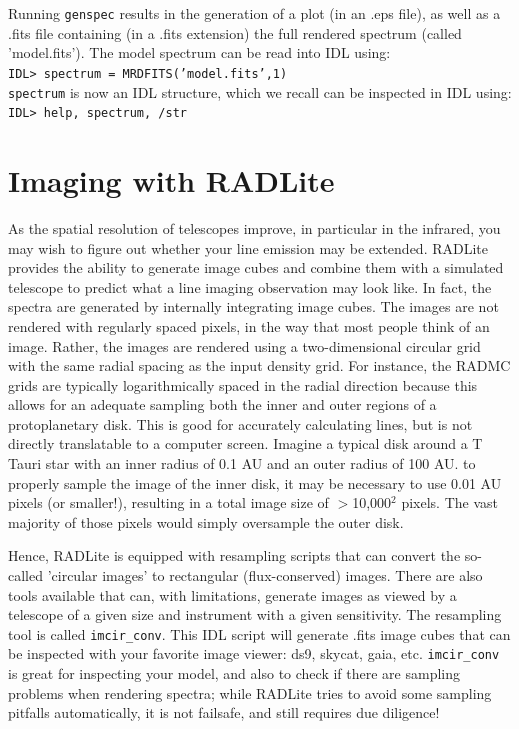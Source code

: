 \documentclass[11pt]{article}
\begin{document}
Running {\tt genspec} results in the generation of a plot (in an .eps file), as well as a .fits file containing (in a .fits extension) the full rendered spectrum (called 'model.fits'). 
The model spectrum can be read into IDL using:\\
{\tt IDL> spectrum = MRDFITS('model.fits',1)} \\
{\tt spectrum} is now an IDL structure, which we recall can be inspected in IDL using:\\
{\tt IDL> help, spectrum, /str}

\section{Imaging with RADLite}

As the spatial resolution of telescopes improve, in particular in the infrared, you may wish to figure out whether your line emission
may be extended. RADLite provides the ability to generate image cubes and combine them with a simulated telescope to predict what a 
line imaging observation may look like. In fact, the spectra are generated by internally integrating image cubes. The images are
not rendered with regularly spaced pixels, in the way that most people think of an image. Rather, the images are rendered using a 
two-dimensional circular grid with the same radial spacing as the input density grid. For instance, the RADMC grids are typically
logarithmically spaced in the radial direction because this allows for an adequate sampling both the inner and outer regions of a 
protoplanetary disk. This is good for accurately calculating lines, but is not directly translatable to a computer screen. Imagine a typical disk around
a T Tauri star with an inner radius of 0.1 AU and an outer radius of 100 AU. to properly sample the image of the inner disk, it may be necessary to
use 0.01 AU pixels (or smaller!), resulting in a total image size of $>$10,000$^2$ pixels. The vast majority of those pixels would simply oversample
the outer disk. 

Hence, RADLite is equipped with resampling scripts that can convert the so-called 'circular images' to rectangular (flux-conserved) images.
There are also tools available that can, with limitations, generate images as viewed by a telescope of a given size and instrument with a given 
sensitivity. The resampling tool is called {\tt imcir\_conv}. This IDL script will generate .fits image cubes that can be inspected
with your favorite image viewer: ds9, skycat, gaia, etc. {\tt imcir\_conv} is great for inspecting your model, and also to check if there are
sampling problems when rendering spectra; while RADLite tries to avoid some sampling pitfalls automatically, it is not failsafe, 
and still requires due diligence! 
\end{document}
